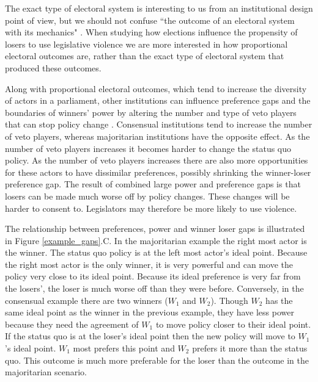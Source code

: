 \documentclass[a4paper]{article}\usepackage{graphicx, color}
\begin{document}
{The exact type of electoral system is interesting to us from an institutional design point of view, but we should not confuse ``the outcome of an electoral system with its mechanics" \citep[][109]{Golder2005}. When studying how elections influence the propensity of losers to use legislative violence we are more interested in how proportional electoral outcomes are, rather than the exact type of electoral system that produced these outcomes. 

Along with proportional electoral outcomes, which tend to increase the diversity of actors in a parliament, other institutions can influence preference gaps and the boundaries of winners' power by altering the number and type of veto players that can stop policy change \citep{Tsebelis2002}. Consensual institutions tend to increase the number of veto players, whereas majoritarian institutions have the opposite effect. As the number of veto players increases it becomes harder to change the status quo policy. As the number of veto players increases there are also more opportunities for these actors to have dissimilar preferences, possibly shrinking the winner-loser preference gap. The result of combined large power and preference gaps is that losers can be made much worse off by policy changes. These changes will be harder to consent to. Legislators may therefore be more likely to use violence.

The relationship between preferences, power and winner loser gaps is illustrated in Figure \ref{example_gaps}.C. In the majoritarian example the right most actor is the winner. The status quo policy is at the left most actor's ideal point. Because the right most actor is the only winner, it is very powerful and can move the policy very close to its ideal point. Because its ideal preference is very far from the losers', the loser is much worse off than they were before. Conversely, in the consensual example there are two winners ($W_{1}$ and $W_{2}$). Though $W_{2}$ has the same ideal point as the winner in the previous example, they have less power because they need the agreement of $W_{1}$ to move policy closer to their ideal point. If the status quo is at the loser's ideal point then the new policy will move to $W_{1}$'s ideal point. $W_{1}$ most prefers this point and $W_{2}$ prefers it more than the status quo. This outcome is much more preferable for the loser than the outcome in the majoritarian  scenario.

}
\end{document}
